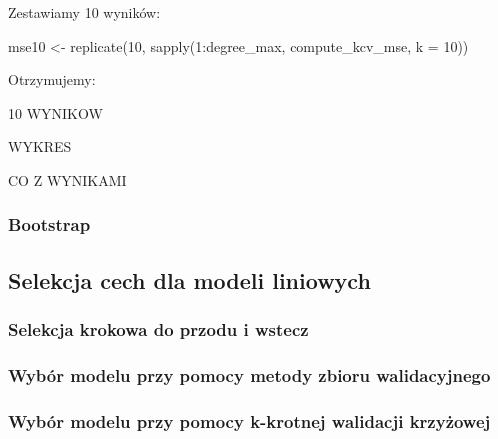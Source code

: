 \documentclass{article}
\begin{document}
Zestawiamy 10 wyników:
\begin{Rcode}
mse10 <- replicate(10, sapply(1:degree_max, compute_kcv_mse, k = 10))
\end{Rcode}
Otrzymujemy:
\begin{Rcode}
    10 WYNIKOW
\end{Rcode}
\begin{Rcode}
    WYKRES
\end{Rcode}
\begin{Rcode}
    CO Z WYNIKAMI
\end{Rcode}

\subsubsection{Bootstrap}
\begin{Rcode}

}
\end{Rcode}

\subsection{Selekcja cech dla modeli liniowych}
\subsubsection{Selekcja krokowa do przodu i wstecz}
\subsubsection{Wybór modelu przy pomocy metody zbioru walidacyjnego}
\subsubsection{Wybór modelu przy pomocy k-krotnej walidacji krzyżowej}
\end{document}

